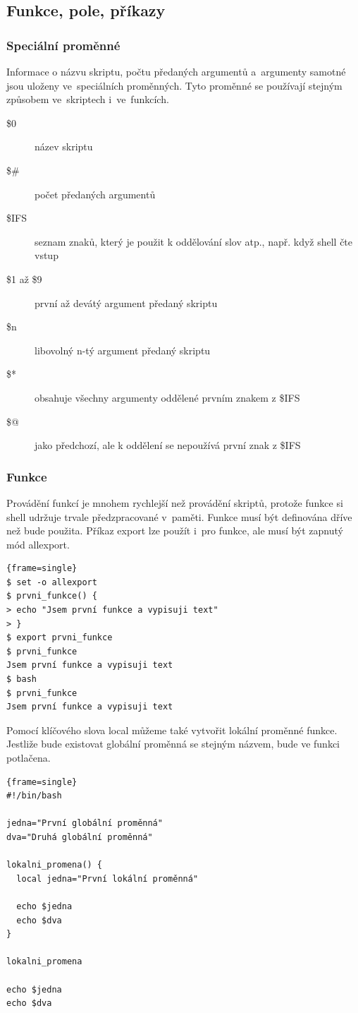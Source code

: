 \documentclass[a4paper,12pt]{article}
\newenvironment{codeframe}{%
  \begin{Sbox} 
    \begin{minipage} 
      {\columnwidth-\leftmargin-\rightmargin-2\fboxsep-2\fboxrule-4pt} 
}{%

  \end{minipage} 
  \end{Sbox} 
  \begin{center} 
    \fcolorbox{black}{codeback}{\TheSbox} 
  \end{center} 
}
\begin{document}
\subsection{Funkce, pole, příkazy}
\subsubsection{Speciální proměnné}
Informace o názvu skriptu, počtu předaných argumentů a~argumenty samotné jsou uloženy ve~speciálních proměnných. Tyto proměnné se používají stejným způsobem ve~skriptech i~ve~funkcích\cite{ABC_SBASH}.
\begin{description}
 \item[\$0] název skriptu
 \item[\$\#] počet předaných argumentů
 \item[\$IFS] seznam znaků, který je použit k oddělování slov atp., např. když shell čte vstup
 \item[\$1 až \$9] první až devátý argument předaný skriptu
 \item[\${n}] libovolný n-tý argument předaný skriptu
 \item[\$*] obsahuje všechny argumenty oddělené prvním znakem z \$IFS
 \item[\$@] jako předchozí, ale k oddělení se nepoužívá první znak z \$IFS
 \end{description}
\subsubsection{Funkce}
Provádění funkcí je mnohem rychlejší než provádění skriptů, protože funkce si shell udržuje trvale předzpracované v~paměti. Funkce musí být 
definována dříve než bude použita. Příkaz export lze použít i~pro funkce, ale musí být zapnutý mód allexport\cite{ABC_SBASH}.
    \begin{codeframe}
      \begin{Verbatim}{frame=single}
$ set -o allexport
$ prvni_funkce() {
> echo "Jsem první funkce a vypisuji text"
> }
$ export prvni_funkce
$ prvni_funkce
Jsem první funkce a vypisuji text
$ bash
$ prvni_funkce
Jsem první funkce a vypisuji text
\end{Verbatim} 
    \end{codeframe}
Pomocí klíčového slova local můžeme také vytvořit lokální proměnné funkce. Jestliže bude existovat globální proměnná se stejným názvem, bude ve funkci potlačena\cite{ABC_SBASH}.
    \begin{codeframe}
      \begin{Verbatim}{frame=single}
#!/bin/bash

jedna="První globální proměnná"
dva="Druhá globální proměnná"

lokalni_promena() {
  local jedna="První lokální proměnná"

  echo $jedna
  echo $dva
}

lokalni_promena

echo $jedna
echo $dva
\end{Verbatim} 
    \end{codeframe}
\end{document}
